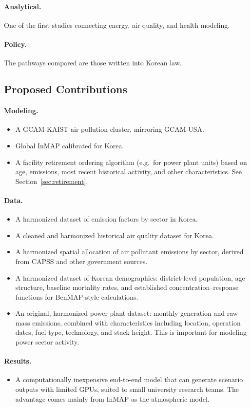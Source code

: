 \paragraph{Analytical.} One of the first studies connecting energy, air
quality, and health modeling. 

\paragraph{Policy.} The pathways compared are those written into Korean law.

\subsection{Proposed Contributions}\label{sec:proposed}

\paragraph{Modeling.}
\begin{itemize}
  \item A GCAM-KAIST air pollution cluster, mirroring GCAM-USA.
  \item Global InMAP calibrated for Korea.
  \item A facility retirement ordering algorithm (e.g.\ for power plant units)
        based on age, emissions, most recent historical activity, and other
        characteristics. See Section~\ref{sec:retirement}.
\end{itemize}

\paragraph{Data.}
\begin{itemize}
  \item A harmonized dataset of emission factors by sector in Korea.
  \item A cleaned and harmonized historical air quality dataset for Korea.
  \item A harmonized spatial allocation of air pollutant emissions by sector,
        derived from CAPSS and other government sources.
  \item A harmonized dataset of Korean demographics: district-level
        population, age structure, baseline mortality rates, and established
        concentration--response functions for BenMAP-style calculations.
  \item An original, harmonized power plant dataset: monthly generation and
        raw mass emissions, combined with characteristics including location,
        operation dates, fuel type, technology, and stack height. This is
        important for modeling power sector activity.
\end{itemize}

\paragraph{Results.}
\begin{itemize}
  \item A computationally inexpensive end-to-end model that can generate
        scenario outputs with limited GPUs, suited to small university
        research teams. The advantage comes mainly from InMAP as the
        atmospheric model.
\end{itemize}
